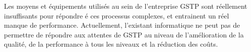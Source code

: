 		Les moyens et équipements utilisés au sein de l'entreprise GSTP sont réellement insuffisants pour répondre é ces processus complexes, et entrainent un réel manque de performance. Actuellement, l'existant informatique ne peut pas de permettre de répondre aux attentes de
GSTP au niveau de l'amélioration de la qualité, de la performance à tous les niveaux et la réduction des coûts.
